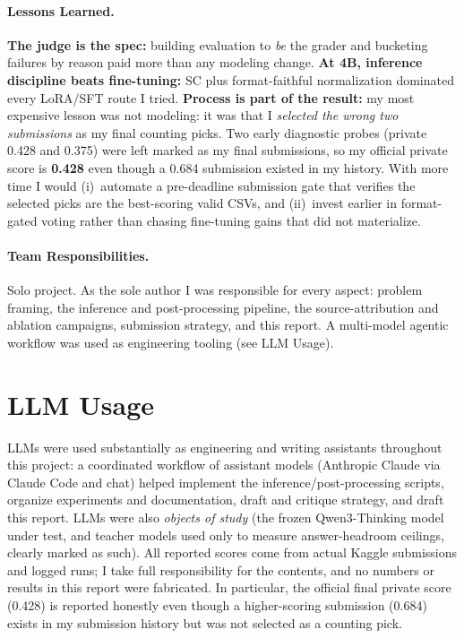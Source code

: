 \documentclass{article}
\newcommand{\new}[1]{#1}
\begin{document}
\new{
\paragraph{Lessons Learned.}
\textbf{The judge is the spec:} building evaluation to \emph{be} the grader and bucketing
failures by reason paid more than any modeling change. \textbf{At 4B, inference
discipline beats fine-tuning:} SC plus format-faithful normalization dominated every
LoRA/SFT route I tried. \textbf{Process is part of the result:} my most expensive
lesson was not modeling: it was that I \emph{selected the wrong two submissions} as
my final counting picks. Two early diagnostic probes (private 0.428 and 0.375) were
left marked as my final submissions, so my official private score is \textbf{0.428}
even though a 0.684 submission existed in my history. With more time I would
(i)~automate a pre-deadline submission gate that verifies the selected picks are the
best-scoring valid CSVs, and (ii)~invest earlier in format-gated voting rather than
chasing fine-tuning gains that did not materialize.
}

\paragraph{Team Responsibilities.}
Solo project. As the sole author I was responsible for every
aspect: problem framing, the inference and post-processing pipeline, the
source-attribution and ablation campaigns, submission strategy, and this report. A
multi-model agentic workflow was used as engineering tooling (see LLM Usage).

\section*{LLM Usage}
LLMs were used substantially as engineering and writing assistants throughout this
project: a coordinated workflow of assistant models (Anthropic Claude via Claude Code
and chat) helped implement the inference/post-processing scripts, organize
experiments and documentation, draft and critique strategy, and draft this report.
LLMs were also \emph{objects of study} (the frozen Qwen3-Thinking model under test, and
teacher models used only to measure answer-headroom ceilings, clearly marked as such).
All reported scores come from actual Kaggle submissions and logged runs; I
take full responsibility for the contents, and no numbers or results in this report
were fabricated. In particular, the official final private score (0.428) is reported
honestly even though a higher-scoring submission (0.684) exists in my submission
history but was not selected as a counting pick.



\end{document}
